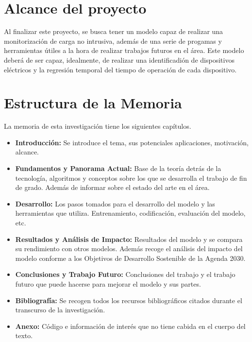 \section{Alcance del proyecto}
\label{sec:alcanceproyecto}
Al finalizar este proyecto, se busca tener un modelo capaz de realizar una monitorización de carga no intrusiva, además de una serie de progamas y herramientas útiles a la hora de realizar trabajos futuros en el área.
Este modelo deberá de ser capaz, idealmente, de realizar una identificadión de dispositivos eléctricos y la regresión temporal del tiempo de operación de cada dispositivo.

\section{Estructura de la Memoria}
\label{sec:estructuramemoria}
La memoria de esta investigación tiene los siguientes capítulos.
\begin{itemize}
	\item \textbf{Introducción: } Se introduce el tema, sus potenciales aplicaciones, motivación, alcance. 
	\item \textbf{Fundamentos y Panorama Actual: } Base de la teoría detrás de la tecnología, algoritmos y conceptos sobre los que se desarrolla el trabajo de fin de grado. Además de informar sobre el estado del arte en el área.
	\item \textbf{Desarrollo: } Los pasos tomados para el desarrollo del modelo y las herramientas que utiliza. Entrenamiento, codificación, evaluación del modelo, etc. 
	\item \textbf{Resultados y Análisis de Impacto: } Resultados del modelo y se compara su rendimiento con otros modelos. Además recoge el análisis del impacto del modelo conforme a los Objetivos de Desarrollo Sostenible de la Agenda 2030.
	\item \textbf{Conclusiones y Trabajo Futuro: } Conclusiones del trabajo y el trabajo futuro que puede hacerse para mejorar el modelo y sus partes. 
	\item \textbf{Bibliografía: } Se recogen todos los recursos bibliográficos citados durante el transcurso de la investigación.
	\item \textbf{Anexo: } Código e información de interés que no tiene cabida en el cuerpo del texto. 
\end{itemize}



